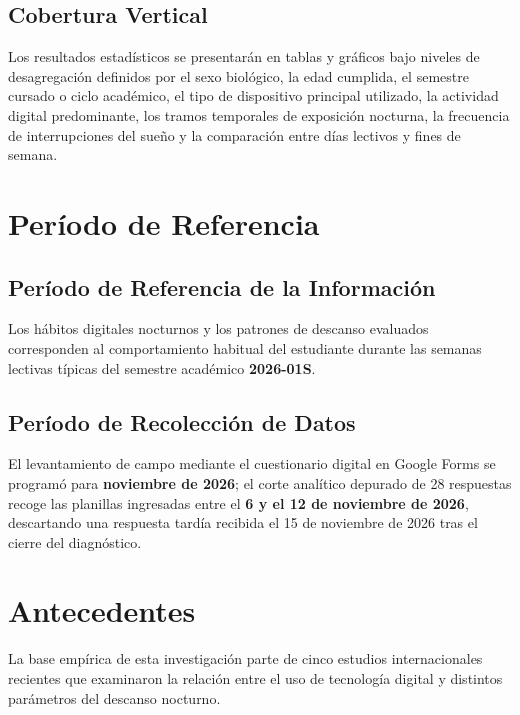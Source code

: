 \documentclass[12pt, letterpaper]{article}
\begin{document}
\subsection{Cobertura Vertical}
Los resultados estadísticos se presentarán en tablas y gráficos bajo niveles de desagregación definidos por el sexo biológico, la edad cumplida, el semestre cursado o ciclo académico, el tipo de dispositivo principal utilizado, la actividad digital predominante, los tramos temporales de exposición nocturna, la frecuencia de interrupciones del sueño y la comparación entre días lectivos y fines de semana.


\section{Período de Referencia}

\subsection{Período de Referencia de la Información}
Los hábitos digitales nocturnos y los patrones de descanso evaluados corresponden al comportamiento habitual del estudiante durante las semanas lectivas típicas del semestre académico \textbf{2026-01S}.

\subsection{Período de Recolección de Datos}
El levantamiento de campo mediante el cuestionario digital en Google Forms se programó para \textbf{noviembre de 2026}; el corte analítico depurado de 28 respuestas recoge las planillas ingresadas entre el \textbf{6 y el 12 de noviembre de 2026}, descartando una respuesta tardía recibida el 15 de noviembre de 2026 tras el cierre del diagnóstico.


\section{Antecedentes}

La base empírica de esta investigación parte de cinco estudios internacionales recientes que examinaron la relación entre el uso de tecnología digital y distintos parámetros del descanso nocturno.
\end{document}
